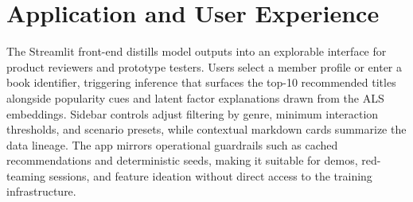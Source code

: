 \section{Application and User Experience}
The Streamlit front-end distills model outputs into an explorable interface for product reviewers and prototype testers. Users select a member profile or enter a book identifier, triggering inference that surfaces the top-10 recommended titles alongside popularity cues and latent factor explanations drawn from the ALS embeddings. Sidebar controls adjust filtering by genre, minimum interaction thresholds, and scenario presets, while contextual markdown cards summarize the data lineage. The app mirrors operational guardrails such as cached recommendations and deterministic seeds, making it suitable for demos, red-teaming sessions, and feature ideation without direct access to the training infrastructure.
